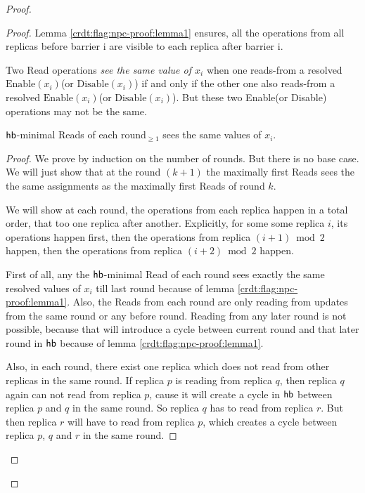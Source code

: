 \begin{proof}
\begin{proof}
Lemma \ref{crdt:flag:npc-proof:lemma1} ensures, all the operations from all replicas before barrier i are visible to each replica after barrier i.

  Two \textrm{Read} operations \emph{see the same value of $x_i$} when one reads-from a resolved $\mathrm{Enable}(x_i)$(or $\mathrm{Disable}(x_i)$) if and only if the other one also reads-from a resolved $\mathrm{Enable}(x_i)$(or $\mathrm{Disable}(x_i)$). But these two \textrm{Enable}(or \textrm{Disable}) operations may not be the same.

  \begin{lemma}
    \label{crdt:flag:npc-proof:lemma2}
    $\textsf{hb}$-minimal \textrm{Read}s of each round$_{\geq1}$ sees the same values of $x_i$.
  \end{lemma}

  \begin{proof}
    We prove by induction on the number of rounds. But there is no base case. We will just show that at the round $(k+1)$ the maximally first \textrm{Read}s sees the the same assignments as the maximally first \textrm{Read}s of round $k$.

    We will show at each round, the operations from each replica happen in a total order, that too one replica after another. Explicitly, for some some replica $i$, its operations happen first, then the operations from replica $(i+1) \bmod 2$ happen, then the operations from replica $(i+2) \bmod 2$ happen. 

    First of all, any the $\textsf{hb}$-minimal \textrm{Read} of each round sees exactly the same resolved values of $x_i$ till last round because of lemma \ref{crdt:flag:npc-proof:lemma1}. Also, the \textrm{Read}s from each round are only reading from updates from the same round or any before round. Reading from any later round is not possible, because that will introduce a cycle between current round and that later round in $\textsf{hb}$ because of lemma \ref{crdt:flag:npc-proof:lemma1}.

    Also, in each round, there exist one replica which does not read from other replicas in the same round. If replica $p$ is reading from replica $q$, then replica $q$ again can not read from replica $p$, cause it will create a cycle in $\textsf{hb}$ between replica $p$ and $q$ in the same round. So replica $q$ has to read from replica $r$. But then replica $r$ will have to read from replica $p$, which creates a cycle between replica $p$, $q$ and $r$ in the same round.


\end{proof}
\end{proof}
\end{proof}
